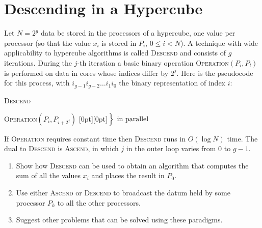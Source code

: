 \documentclass[11pt]{article}
\begin{document}
  \section{Descending in a Hypercube}
    Let $N = 2^g$ data be stored in the processors of a hypercube, one value per processor (so that the value $x_i$ is stored in $P_i$, $0 \leq i < N$). A technique with wide applicability to hypercube algorithms is called \textsc{Descend} and consists of $g$ iterations. During the $j$-th iteration a basic binary operation \textsc{Operation}$(P_i, P_l)$ is performed on data in cores whose indices differ by $2^j$. Here is the pseudocode for this process, with $i_{g-1}i_{g-2}\dots i_{1}i_{0}$ the binary representation of index $i$:

    \newpage

    \begin{algorithm}
      \caption{\textsc{Descend}}
      \label{ad}
      \begin{algorithmic}[1]
         
           
              \textsc{Operation}$(P_i, P_{i+2^j})$
              \hspace{2mm}\raisebox{.5\baselineskip}[0pt][0pt]{$\left.\rule{0pt}{1.0\baselineskip}\right\}\ \mbox{in parallel}$} 
      \end{algorithmic}
    \end{algorithm}

    \noindent If \textsc{Operation} requires constant time then \textsc{Descend} runs in $O(\log N)$ time. The dual to \textsc{Descend} is \textsc{Ascend}, in which $j$ in the outer loop varies from $0$ to $g-1$.

    \begin{enumerate}[leftmargin=*]
      \item Show how \textsc{Descend} can be used to obtain an algorithm that computes the sum of all the values $x_i$ and places the result in $P_0$.
      \item Use either \textsc{Ascend} or \textsc{Descend} to broadcast the datum held by some processor $P_k$ to all the other processors.
      \item Suggest other problems that can be solved using these paradigms.
    \end{enumerate}
\end{document}
